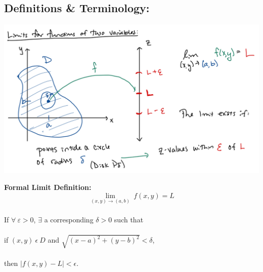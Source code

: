 \subsection*{Definitions \& Terminology:}
\includegraphics[]{Limit-Diagram.png}

\textbf{Formal Limit Definition:}\\
\[\lim_{(x,y)\rightarrow (a,b)} \ f(x,y) = L\]~\\

If \(\forall\  \varepsilon >0\), \(\exists\) a corresponding \(\delta >0\) such that\\~\\ if \((x,y)\ \epsilon\ D\) and \(\sqrt{(x-a)^2+(y-b)^2}<\delta\),\\~\\
 then \(\left| f(x,y)-L \right| < \epsilon\).


